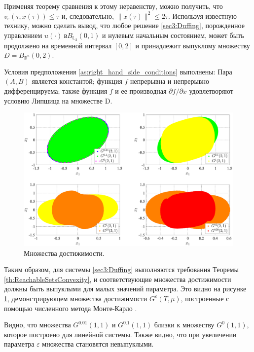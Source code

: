 \documentclass[../main.tex]{subfiles}
\begin{document}
\begin{pr}
	Применяя теорему сравнения к этому неравенству, можно получить, что $v_{\varepsilon}(\tau,x(\tau)) \leqslant \tau$ и, следовательно, $\|x(\tau)\|^2 \leqslant 2 \tau$. 
	Используя известную технику, можно сделать вывод, что любое решение \eqref{sec3:Duffing}, порожденное управлением $u(\cdot)\ в B_{\mathbb{L}_2}(0,1)$ и нулевым начальным состоянием, может быть продолжено на временной интервал $[0,2]$ и принадлежит выпуклому множеству $D = B_{\mathbb{R}^n}(0,2)$.
	
	Условия предположения \ref{as:right_hand_side_conditions} выполнены: Пара $(A,B)$ является константой; функция $f$ непрерывна и непрерывно дифференцируема; также функция $f$ и ее производная $\partial f/\partial x$ удовлетворяют условию Липшица на множестве D.
	
	\begin{figure}[t]
		\centerline{
			\includegraphics[width=\textwidth]{images/Osipov_QuaziDuffing.eps}}
		\caption{Множества достижимости.}
		\label{fig:Duffing}
	\end{figure}
	
	Таким образом, для системы \eqref{sec3:Duffing} выполняются требования Теоремы \ref{th:ReachableSetsConvexity}, и соответствующие множества достижимости должны быть выпуклыми для малых значений параметра. 
	Это видно на рисунке \ref{fig:Duffing}, демонстрирующем множества достижимости $G^{\varepsilon}(T,\mu)$, построенные с помощью численного метода Монте-Карло \cite{Patent,Zykov}.
	
	Видно, что множества $G^{0.01}(1,1) $ и $G^{0.1}(1,1) $ близки к множеству $G^{0}(1,1) $, которое построено для линейной системы. 
	Также видно, что при увеличении параметра $\varepsilon$ множества становятся невыпуклыми. 
	
\end{pr}  %
\end{document}
